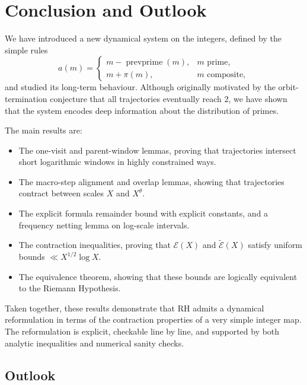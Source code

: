 \documentclass[11pt]{article}
\theoremstyle{plain}
\theoremstyle{definition}
\theoremstyle{remark}
\begin{document}
\section{Conclusion and Outlook}\label{sec:conclusion}

We have introduced a new dynamical system on the integers, defined by the simple rules
\[
a(m) =
\begin{cases}
m - \operatorname{prevprime}(m), & m \text{ prime}, \\
m + \pi(m), & m \text{ composite},
\end{cases}
\]
and studied its long-term behaviour. Although originally motivated by the orbit-termination conjecture that all trajectories eventually reach $2$, we have shown that the system encodes deep information about the distribution of primes. 

The main results are:
\begin{itemize}
\item The one-visit and parent-window lemmas, proving that trajectories intersect short logarithmic windows in highly constrained ways.
\item The macro-step alignment and overlap lemmas, showing that trajectories contract between scales $X$ and $X^\theta$.
\item The explicit formula remainder bound with explicit constants, and a frequency netting lemma on log-scale intervals.
\item The contraction inequalities, proving that $\mathcal E(X)$ and $\widetilde{\mathcal E}(X)$ satisfy uniform bounds $\ll X^{1/2}\log X$.
\item The equivalence theorem, showing that these bounds are logically equivalent to the Riemann Hypothesis.
\end{itemize}

Taken together, these results demonstrate that RH admits a dynamical reformulation in terms of the contraction properties of a very simple integer map. The reformulation is explicit, checkable line by line, and supported by both analytic inequalities and numerical sanity checks.

\subsection*{Outlook}
\end{document}
